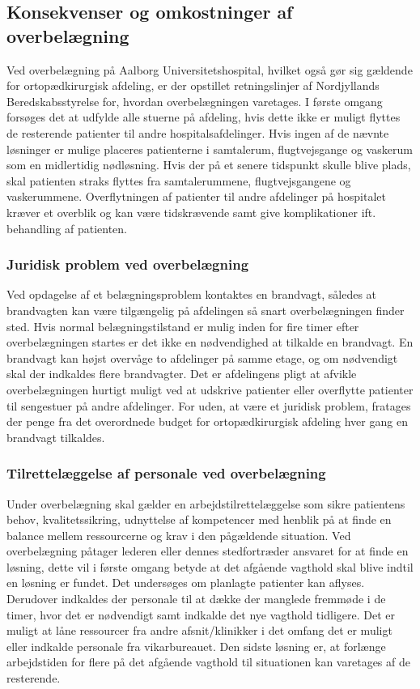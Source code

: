 \subsection{Konsekvenser og omkostninger af overbelægning}
Ved overbelægning på Aalborg Universitetshospital, hvilket også gør sig gældende for ortopædkirurgisk afdeling, er der opstillet retningslinjer af Nordjyllands Beredskabsstyrelse for, hvordan overbelægningen varetages. I første omgang forsøges det at udfylde alle stuerne på afdeling, hvis dette ikke er muligt flyttes de resterende patienter til andre hospitalsafdelinger. Hvis ingen af de nævnte løsninger er mulige placeres patienterne i samtalerum, flugtvejsgange og vaskerum som en midlertidig nødløsning. Hvis der på et senere tidspunkt skulle blive plads, skal patienten straks flyttes fra samtalerummene, flugtvejsgangene og vaskerummene. \cite{Beredskab2016} Overflytningen af patienter til andre afdelinger på hospitalet kræver et overblik og kan være tidskrævende samt give komplikationer ift. behandling af patienten. 

\subsubsection{Juridisk problem ved overbelægning}
Ved opdagelse af et belægningsproblem kontaktes en brandvagt, således at brandvagten kan være tilgængelig på afdelingen så snart overbelægningen finder sted. Hvis normal belægningstilstand er mulig inden for fire timer efter overbelægningen startes er det ikke en nødvendighed at tilkalde en brandvagt. En brandvagt kan højst overvåge to afdelinger på samme etage, og om nødvendigt skal der indkaldes flere brandvagter. Det er afdelingens pligt at  afvikle overbelægningen hurtigt muligt ved at udskrive patienter eller overflytte patienter til sengestuer på andre afdelinger. \cite{Beredskab2016} For uden, at være et juridisk problem, fratages der penge fra det overordnede budget for ortopædkirurgisk afdeling hver gang en brandvagt tilkaldes.


\subsubsection{Tilrettelæggelse af personale ved overbelægning}
Under overbelægning skal gælder en arbejdstilrettelæggelse som sikre patientens behov, kvalitetssikring, udnyttelse af kompetencer med henblik på at finde en balance mellem ressourcerne og krav i den pågældende situation. Ved overbelægning påtager lederen eller dennes stedfortræder ansvaret for at finde en løsning, dette vil i første omgang betyde at det afgående vagthold skal blive indtil en løsning er fundet. Det undersøges om planlagte patienter kan aflyses. Derudover indkaldes der personale til at dække der manglede fremmøde i de timer, hvor det er nødvendigt samt indkalde det nye vagthold tidligere. Det er muligt at låne ressourcer fra andre afsnit/klinikker i det omfang det er muligt eller indkalde personale fra vikarbureauet. Den sidste løsning er, at forlænge arbejdstiden for flere på det afgående vagthold til situationen kan varetages af de resterende. \cite{Bjerg2016}


